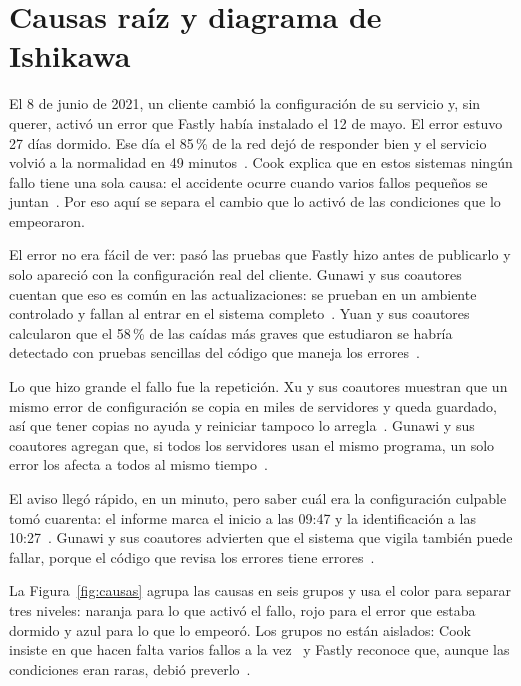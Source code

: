 \section*{Causas raíz y diagrama de Ishikawa}

El 8 de junio de 2021, un cliente cambió la configuración de su servicio y, sin querer, activó
un error que Fastly había instalado el 12 de mayo. El error estuvo 27 días dormido. Ese día el
85\,\% de la red dejó de responder bien y el servicio volvió a la normalidad en 49
minutos~\cite{fastly2021}. Cook explica que en estos sistemas ningún fallo tiene una sola
causa: el accidente ocurre cuando varios fallos pequeños se juntan~\cite[p.~2]{cook1998}. Por
eso aquí se separa el cambio que lo activó de las condiciones que lo empeoraron.

El error no era fácil de ver: pasó las pruebas que Fastly hizo antes de publicarlo y solo
apareció con la configuración real del cliente. Gunawi y sus coautores cuentan que eso es
común en las actualizaciones: se prueban en un ambiente controlado y fallan al entrar en el
sistema completo~\cite[p.~5]{gunawi2016}. Yuan y sus coautores calcularon que el 58\,\% de las
caídas más graves que estudiaron se habría detectado con pruebas sencillas del código que
maneja los errores~\cite[p.~250]{yuan2014}.

Lo que hizo grande el fallo fue la repetición. Xu y sus coautores muestran que un mismo error
de configuración se copia en miles de servidores y queda guardado, así que tener copias no
ayuda y reiniciar tampoco lo arregla~\cite[p.~619]{xu2016}. Gunawi y sus coautores agregan que,
si todos los servidores usan el mismo programa, un solo error los afecta a todos al mismo
tiempo~\cite[p.~6]{gunawi2016}.

El aviso llegó rápido, en un minuto, pero saber cuál era la configuración culpable tomó
cuarenta: el informe marca el inicio a las 09:47 y la identificación a las
10:27~\cite{fastly2021}. Gunawi y sus coautores advierten que el sistema que vigila también
puede fallar, porque el código que revisa los errores tiene errores~\cite[p.~8]{gunawi2016}.

La Figura~\ref{fig:causas} agrupa las causas en seis grupos y usa el color para separar tres
niveles: naranja para lo que activó el fallo, rojo para el error que estaba dormido y azul para
lo que lo empeoró. Los grupos no están aislados: Cook insiste en que hacen falta varios fallos
a la vez~\cite[p.~1]{cook1998} y Fastly reconoce que, aunque las condiciones eran raras, debió
preverlo~\cite{fastly2021}.

